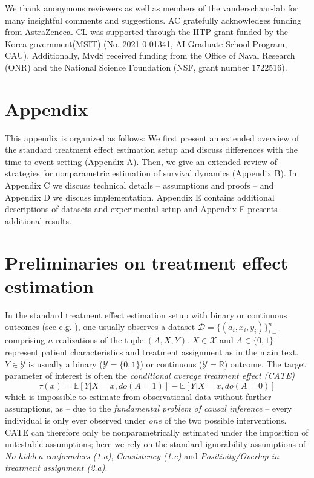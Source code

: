 \documentclass{article}
\begin{document}
\acksection
We thank anonymous reviewers as well as members of the vanderschaar-lab for many insightful comments and suggestions. AC gratefully acknowledges funding from AstraZeneca. CL was supported through the IITP grant funded by the Korea government(MSIT) (No. 2021-0-01341, AI Graduate School Program, CAU). Additionally, MvdS received funding from the Office of Naval Research (ONR) and the National Science Foundation (NSF, grant number 1722516).




\newpage

\newcommand{\newnumbering}{
\setcounter{figure}{0}\renewcommand{\thefigure}{\thesection.\arabic{figure}}
\setcounter{table}{0}\renewcommand{\thetable}{\thesection.\arabic{table}}
\setcounter{equation}{0}\renewcommand{\theequation}{\thesection.\arabic{equation}}
}

\appendix
\section*{Appendix}
This appendix is organized as follows: We first present an extended overview of the standard treatment effect estimation setup and discuss differences with the time-to-event setting (Appendix A). Then, we give an extended review of strategies for nonparametric estimation of survival dynamics (Appendix B). In Appendix C we discuss technical details -- assumptions and proofs -- and Appendix D we discuss implementation. Appendix E contains additional descriptions of datasets and experimental setup and Appendix F presents  additional results.
\section{Preliminaries on treatment effect estimation} 
In the standard treatment effect estimation setup with binary or continuous outcomes (see e.g. \cite{Shalit:16, alaa2018limits, curth2020}), one usually observes a dataset $\mathcal{D}=\{(a_i, x_i, y_i)\}^n_{i=1}$ comprising $n$ realizations of the tuple $(A, X, Y)$. $X\in \mathcal{X}$ and $A \in \{0, 1\}$ represent patient characteristics and treatment assignment as in the main text. $Y\in\mathcal{Y}$ is usually a binary ($\mathcal{Y}=\{0, 1\}$) or continuous ($\mathcal{Y}=\mathbb{R}$) outcome. The target parameter of interest is often the \textit{conditional average treatment effect (CATE)}
\begin{equation}
    \tau(x) = \mathbb{E}[Y|X=x, do(A=1)] - \mathbb{E}[Y|X=x, do(A=0)]
\end{equation}
which is impossible to estimate from observational data without further assumptions, as -- due to the \textit{fundamental problem of causal inference} \cite{holland1986statistics} -- every individual is only ever observed under \textit{one} of the two possible interventions. CATE can therefore only be nonparametrically estimated under the imposition of untestable assumptions;
here we rely on the standard ignorability assumptions \cite{rosenbaum1983central} of \textit{No hidden confounders (1.a)}, \textit{Consistency (1.c)} and \textit{Positivity/Overlap in treatment assignment (2.a)}.
\end{document}
